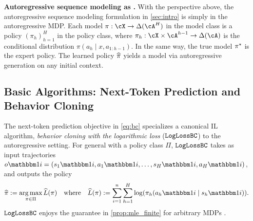  















\vspace{0.3em}
\noindent\textbf{Autoregressive sequence modeling as \IL{}.} With the
perspective above, the autoregressive sequence modeling formulation in
\cref{sec:intro} is simply
\IL{}{} in the autoregressive MDP. %
Each model $\pi:\cX\to\Delta(\cA^H)$ in the model class is a policy $(\pi_h)_{h=1}^H$ in the policy class, where $\pi_h: \cX\times\cA^{h-1}\to\Delta(\cA)$ is the conditional distribution $\pi(a_h\mid{}x,a_{1:h-1})$. In the same way, the true model $\pi^{\star}$ is the expert policy. The learned policy $\widehat{\pi}$ yields a model via autoregressive generation on any initial context. %
\loose
%
\subsection{Basic Algorithms: Next-Token Prediction and Behavior
  Cloning}
\label{sec:basic}

The next-token prediction objective in \cref{eq:bc}
specializes a canonical IL algorithm, \emph{behavior cloning with the
  logarithmic loss} ($\texttt{LogLossBC}$) to the autoregressive setting. For
general \IL{} with a policy class $\Pi$, $\texttt{LogLossBC}$ takes as input trajectories $o\ind{i} = (s_1\ind{i},a_1\ind{i},\dots,s_H\ind{i},a_H\ind{i})$, and outputs the policy\loose
%
  \begin{equation}
    \label{eq:bc_general}
    \pihat := \argmax_{\pi \in \Pi} \wh L(\pi) \quad\text{where}\quad
  \wh L(\pi) := \sum_{i=1}^n \sum_{h=1}^H \log 
  (\pihi).\end{equation}
$\texttt{LogLossBC}$
  enjoys the guarantee in \cref{prop:mle_finite} for arbitrary MDPs \citep{foster2024behavior}.




